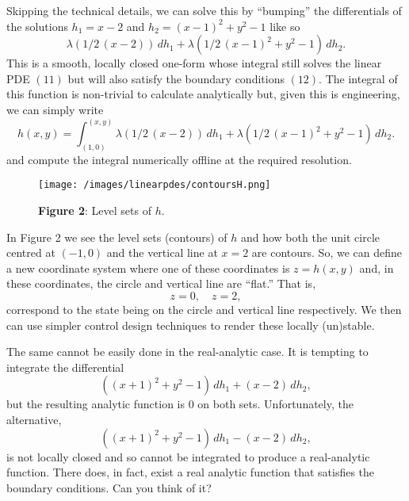 Skipping the technical details, we can solve this by ``bumping'' the differentials of the solutions \(h_1 = x - 2\) and \(h_2 = (x-1)^2 + y^2 - 1\) like so
\[
  \lambda(1/2\,(x - 2))\, dh_1
  +
  \lambda(1/2\,(x - 1)^2 + y^2 - 1)\, dh_2.
\]
This is a smooth, locally closed one-form whose integral still solves the linear PDE \((11)\) but will also satisfy the boundary conditions \((12)\).
The integral of this function is non-trivial to calculate analytically but, given this is engineering, we can simply write
\[
  h(x, y)
    =
      \int_{(1, 0)}^{(x, y)} 
        \lambda(1/2\,(x - 2))\, dh_1
        +
        \lambda(1/2\,(x - 1)^2 + y^2 - 1)\, dh_2.
\]
and compute the integral numerically offline at the required resolution.
\begin{figure}
  \texttt{[image: /images/linearpdes/contoursH.png]}
  \caption{%
    \textbf{Figure 2}: Level sets of \(h.\)
  }
\end{figure}
In Figure 2 we see the level sets (contours) of \(h\) and how both the unit circle centred at \((-1, 0)\) and the vertical line at \(x = 2\) are contours.
So, we can define a new coordinate system where one of these coordinates is \(z = h(x,y)\) and, in these coordinates, the circle and vertical line are ``flat.''
That is,
\[
  z = 0, \quad z = 2,
\]
correspond to the state being on the circle and vertical line respectively.
We then can use simpler control design techniques to render these locally (un)stable.

The same cannot be easily done in the real-analytic case.
It is tempting to integrate the differential
\[
  ((x + 1)^2 + y^2 - 1)\, dh_1
  +
  (x - 2)\, dh_2,
\]
but the resulting analytic function is \(0\) on both sets.
Unfortunately, the alternative,
\[
  ((x + 1)^2 + y^2 - 1)\, dh_1
  -
  (x - 2)\, dh_2,
\]
is not locally closed and so cannot be integrated to produce a real-analytic function.
There does, in fact, exist a real analytic function that satisfies the boundary conditions.
Can you think of it?